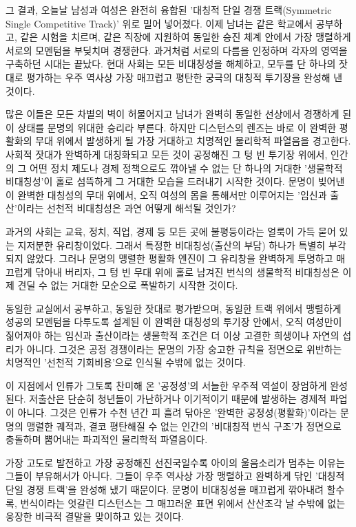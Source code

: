 그 결과, 오늘날 남성과 여성은 완전히 융합된 '대칭적 단일 경쟁 트랙(Symmetric Single Competitive Track)' 위로 밀어 넣어졌다. 이제 남녀는 같은 학교에서 공부하고, 같은 시험을 치르며, 같은 직장에 지원하여 동일한 승진 체계 안에서 가장 맹렬하게 서로의 모멘텀을 부딪치며 경쟁한다. 과거처럼 서로의 다름을 인정하며 각자의 영역을 구축하던 시대는 끝났다. 현대 사회는 모든 비대칭성을 해체하고, 모두를 단 하나의 잣대로 평가하는 우주 역사상 가장 매끄럽고 평탄한 궁극의 대칭적 투기장을 완성해 낸 것이다.

많은 이들은 모든 차별의 벽이 허물어지고 남녀가 완벽히 동일한 선상에서 경쟁하게 된 이 상태를 문명의 위대한 승리라 부른다. 하지만 디스턴스의 렌즈는 바로 이 완벽한 평활화의 무대 위에서 발생하게 될 가장 거대하고 치명적인 물리학적 파열음을 경고한다.
사회적 잣대가 완벽하게 대칭화되고 모든 것이 공정해진 그 텅 빈 투기장 위에서, 인간의 그 어떤 정치 제도나 경제 정책으로도 깎아낼 수 없는 단 하나의 거대한 '생물학적 비대칭성'이 홀로 섬뜩하게 그 거대한 모습을 드러내기 시작한 것이다. 문명이 빚어낸 이 완벽한 대칭성의 무대 위에서, 오직 여성의 몸을 통해서만 이루어지는 '임신과 출산'이라는 선천적 비대칭성은 과연 어떻게 해석될 것인가?

과거의 사회는 교육, 정치, 직업, 경제 등 모든 곳에 불평등이라는 얼룩이 가득 묻어 있는 지저분한 유리창이었다. 그래서 특정한 비대칭성(출산의 부담) 하나가 특별히 부각되지 않았다. 그러나 문명의 맹렬한 평활화 엔진이 그 유리창을 완벽하게 투명하고 매끄럽게 닦아내 버리자, 그 텅 빈 무대 위에 홀로 남겨진 번식의 생물학적 비대칭성은 이제 견딜 수 없는 거대한 모순으로 폭발하기 시작한 것이다.

동일한 교실에서 공부하고, 동일한 잣대로 평가받으며, 동일한 트랙 위에서 맹렬하게 성공의 모멘텀을 다투도록 설계된 이 완벽한 대칭성의 투기장 안에서, 오직 여성만이 짊어져야 하는 임신과 출산이라는 생물학적 조건은 더 이상 고결한 희생이나 자연의 섭리가 아니다. 그것은 공정 경쟁이라는 문명의 가장 숭고한 규칙을 정면으로 위반하는 치명적인 '선천적 기회비용'으로 인식될 수밖에 없는 것이다.

이 지점에서 인류가 그토록 찬미해 온 '공정성'의 서늘한 우주적 역설이 장엄하게 완성된다. 저출산은 단순히 청년들이 가난하거나 이기적이기 때문에 발생하는 경제적 파업이 아니다. 그것은 인류가 수천 년간 피 흘려 닦아온 '완벽한 공정성(평활화)'이라는 문명의 맹렬한 궤적과, 결코 평탄해질 수 없는 인간의 '비대칭적 번식 구조'가 정면으로 충돌하며 뿜어내는 파괴적인 물리학적 파열음이다.

가장 고도로 발전하고 가장 공정해진 선진국일수록 아이의 울음소리가 멈추는 이유는 그들이 부유해서가 아니다. 그들이 우주 역사상 가장 맹렬하고 완벽하게 닦인 '대칭적 단일 경쟁 트랙'을 완성해 냈기 때문이다. 문명이 비대칭성을 매끄럽게 깎아내려 할수록, 번식이라는 엇갈린 디스턴스는 그 매끄러운 표면 위에서 산산조각 날 수밖에 없는 웅장한 비극적 결말을 맞이하고 있는 것이다.